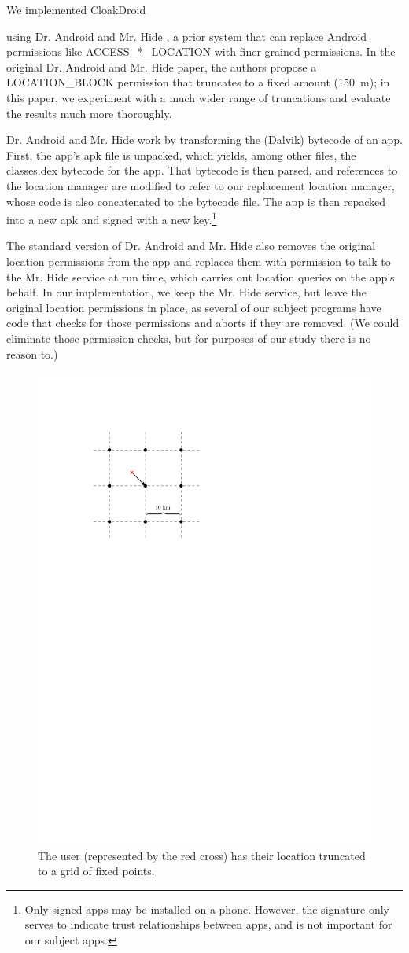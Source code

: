 \documentclass[10pt, conference, compsocconf]{IEEEtran}
\newcommand{\fuzzer}{CloakDroid\xspace}
\newcommand{\code}[1]{\textsf{#1}}
\begin{document}
We implemented \fuzzer{ using Dr. Android and Mr. Hide
\cite{jsjeon:spsm12}, a prior system that can replace Android
permissions like \code{ACCESS\_*\_LOCATION} with finer-grained
permissions. In the original Dr. Android and Mr. Hide paper, the
authors propose a \code{LOCATION\_BLOCK} permission that truncates to
a fixed amount (150~m); in this paper, we experiment with a much wider
range of truncations and evaluate the results much more thoroughly.

Dr. Android and Mr. Hide work by transforming the (Dalvik) bytecode of
an app. First, the app's apk file is unpacked, which yields, among
other files, the \code{classes.dex} bytecode for the app. That
bytecode is then parsed, and references to the location manager are
modified to refer to our replacement location manager, whose code is
also concatenated to the bytecode file. The app is then repacked into
a new apk and signed with a new key.\footnote{Only signed apps may be
  installed on a phone. However, the signature only serves to indicate trust relationships
  between apps, and is not important for our subject apps.}

The standard version of Dr. Android and Mr. Hide also removes the
original location permissions from the app and replaces them with
permission to talk to the Mr. Hide service at run time, which carries
out location queries on the app's behalf. In our implementation, we
keep the Mr. Hide service, but leave the original location permissions
in place, as several of our subject programs have code that checks for
those permissions and aborts if they are removed. (We could eliminate
those permission checks, but for purposes of our study there is no
reason to.)

\begin{figure}
  \centering
  \includegraphics[width=.6\columnwidth]{location_grid_truncation_example}
  \caption{The user (represented by the red cross) has their location
    truncated to a grid of fixed points.}
  \label{fig:grid-truncation-example}
\end{figure}

}
\end{document}
